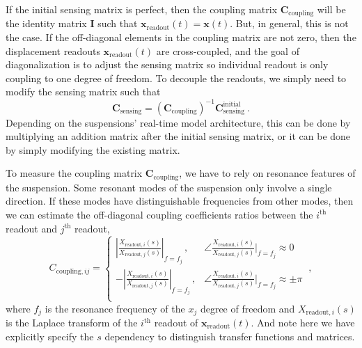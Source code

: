 If the initial sensing matrix is perfect, then the coupling matrix $\mathbf{C}_\mathrm{coupling}$ will be the identity matrix $\mathbf{I}$ such that $\mathbf{x}_\mathrm{readout}(t)=\mathbf{x}(t)$.
But, in general, this is not the case.
If the off-diagonal elements in the coupling matrix are not zero, then the displacement readouts $\mathbf{x}_\mathrm{readout}(t)$ are cross-coupled, and the goal of diagonalization is to adjust the sensing matrix so individual readout is only coupling to one degree of freedom.
To decouple the readouts, we simply need to modify the sensing matrix such that
\begin{equation}
	\boxed{
		\mathbf{C}_\mathrm{sensing} = \left(\mathbf{C}_\mathrm{coupling}\right)^{-1} \mathbf{C}_\mathrm{sensing}^\mathrm{initial}
}\ .
	\label{eqn:sensing_matrix_diagonalization}
\end{equation}
Depending on the suspensions' real-time model architecture, this can be done by multiplying an addition matrix after the initial sensing matrix, or it can be done by simply modifying the existing matrix.

To measure the coupling matrix $\mathbf{C}_\mathrm{coupling}$, we have to rely on resonance features of the suspension.
Some resonant modes of the suspension only involve a single direction.
If these modes have distinguishable frequencies from other modes, then we can estimate the off-diagonal coupling coefficients ratios between the $i^\mathrm{th}$ readout and $j^\mathrm{th}$ readout,
\begin{equation}
	\boxed{
		C_{\mathrm{coupling}, ij}=
		\begin{cases}
			\left\lvert\frac{X_{\mathrm{readout}, i}(s)}{X_{\mathrm{readout}, j}(s)}\right\rvert_{f=f_j}\,, & \angle\frac{X_{\mathrm{readout}, i}(s)}{X_{\mathrm{readout}, j}(s)}\Big\vert_{f=f_j}\approx 0\\
			-\left\lvert\frac{X_{\mathrm{readout}, i}(s)}{X_{\mathrm{readout}, j}(s)}\right\rvert_{f=f_j}\,, & \angle\frac{X_{\mathrm{readout}, i}(s)}{X_{\mathrm{readout}, j}(s)}\Big\rvert_{f=f_j}\approx \pm \pi\\
		\end{cases}
	}\ ,
\end{equation}
where $f_j$ is the resonance frequency of the $x_j$ degree of freedom and $X_{\mathrm{readout},i}(s)$ is the Laplace transform of the $i^\mathrm{th}$ readout of $\mathbf{x}_\mathrm{readout}(t)$.
And note here we have explicitly specify the $s$ dependency to distinguish transfer functions and matrices.

